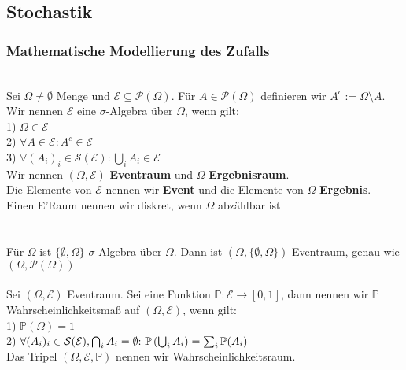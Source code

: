 \subsection*{Stochastik}
\subsubsection*{Mathematische Modellierung des Zufalls}
 \\
Sei \(\Omega \ne \emptyset\) Menge und \(\mathcal E \subseteq \mathcal P(\Omega)\). Für \(A \in \mathcal P(\Omega)\) definieren wir \(A^c := \Omega \setminus A\). \\
Wir nennen \(\mathcal E\) eine \(\sigma\)-Algebra über \(\Omega\), wenn gilt:\\
1) \(\Omega \in \mathcal E\) \\
2) \(\forall A \in \mathcal E{:} A^c \in \mathcal E\) \\
3) \(\forall (A_i)_i \in \mathcal S(\mathcal E){:} \bigcup_i A_i \in \mathcal E\)\\
Wir nennen \((\Omega, \mathcal E)\) \textbf{Eventraum} und \(\Omega\) \textbf{Ergebnisraum}. \\
Die Elemente von \(\mathcal E\) nennen wir \textbf{Event} und die Elemente von \(\Omega\) \textbf{Ergebnis}. \\ Einen E'Raum nennen wir diskret, wenn \(\Omega\) abzählbar ist \\ \\
 \\
Für \(\Omega\) ist \(\{\emptyset, \Omega\}\) \(\sigma\)-Algebra über \(\Omega\). Dann ist \((\Omega, \{\emptyset, \Omega\})\) Eventraum, genau wie \((\Omega, \mathcal P(\Omega))\) \pagebreak \\
 \\
Sei \((\Omega, \mathcal E)\) Eventraum. Sei eine Funktion \({\mathbb P}:{\mathcal E}{\longrightarrow}{[0,1]}\), dann nennen wir \(\mathbb P\) Wahrscheinlichkeitsmaß auf \((\Omega, \mathcal E)\), wenn gilt:\\
1) \(\mathbb P(\Omega) = 1\) \\
2) \(\forall(A_i)_i \in \mathcal S(\mathcal E), \bigcap_iA_i = \emptyset{:}\text{ } \mathbb P\left(\bigcup_iA_i\right) = \sum_{i}\mathbb P(A_i)\) \\
Das Tripel \((\Omega, \mathcal E, \mathbb P)\) nennen wir Wahrscheinlichkeitsraum. \\ \\
